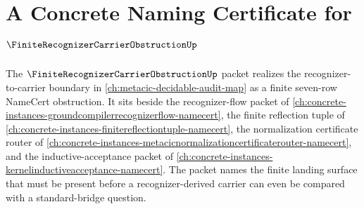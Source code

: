 \chapter{A Concrete Naming Certificate for $\FiniteRecognizerCarrierObstructionUp$}
\label{ch:concrete-instances-finite-recognizer-carrier-obstruction-namecert}

The $\FiniteRecognizerCarrierObstructionUp$ packet realizes the recognizer-to-carrier boundary in \autoref{ch:metacic-decidable-audit-map} as a finite seven-row NameCert obstruction. It sits beside the recognizer-flow packet of \autoref{ch:concrete-instances-groundcompilerrecognizerflow-namecert}, the finite reflection tuple of \autoref{ch:concrete-instances-finitereflectiontuple-namecert}, the normalization certificate router of \autoref{ch:concrete-instances-metacicnormalizationcertificaterouter-namecert}, and the inductive-acceptance packet of \autoref{ch:concrete-instances-kernelinductiveacceptance-namecert}. The packet names the finite landing surface that must be present before a recognizer-derived carrier can even be compared with a standard-bridge question.

